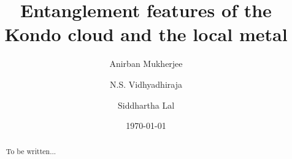 \documentclass[aps,prl,preprint,groupedaddress]{revtex4-2}
\begin{document}

\title{Entanglement features of the Kondo cloud and the local metal}


\author{Anirban Mukherjee}
\author{N.S. Vidhyadhiraja}
\email[]{}
\author{Siddhartha Lal}



\date{\today}

\begin{abstract}
To be written...
\end{abstract}


\maketitle
\end{document}
